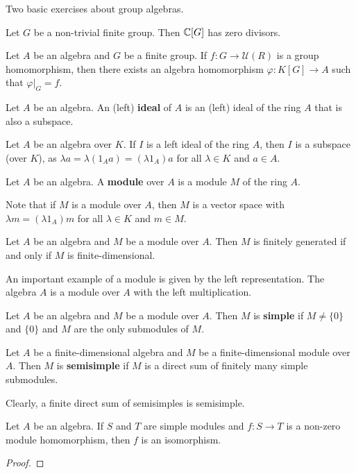 Two basic exercises about group algebras.
 
\begin{exercise}
	Let $G$ be a non-trivial finite group. 
	Then $\mathbb{C}[G]$ has zero divisors. 
\end{exercise}

\begin{exercise}
	Let $A$ be an algebra and $G$ be a finite group. 
	If $f\colon G\to\mathcal{U}(R)$ is a group homomorphism, 
	then there exists an algebra homomorphism 
	$\varphi\colon K[G]\to A$ such that $\varphi|_G=f$.   	
\end{exercise}


\begin{definition}
	Let $A$ be an algebra. An (left) \textbf{ideal} of $A$ is an 
	(left) ideal of the ring $A$ that is also a subspace. 
\end{definition}

Let $A$ be an algebra over $K$. If $I$ is a left ideal of the ring $A$, then 
$I$ is a subspace (over $K$), as $\lambda a=\lambda(1_Aa)=(\lambda 1_A)a$ 
for all $\lambda\in K$ and $a\in A$.  
%

\begin{definition}
	Let $A$ be an algebra. A \textbf{module} over $A$ is a module $M$ of the ring $A$. 
\end{definition}

Note that if $M$ is a module over $A$, 
then $M$ is a vector space 
with $\lambda m=(\lambda 1_A)m$ for all $\lambda\in K$ and $m\in M$. 
 	
\begin{exercise}
	Let $A$ be an algebra and $M$ be a module over $A$. 
	Then $M$ is finitely generated if and only if $M$ is finite-dimensional.
\end{exercise}

An important example of a module is given by the left representation. The 
algebra $A$ is a module over $A$ with the left multiplication. 

\begin{definition}
	Let $A$ be an algebra and $M$ be a module over $A$. Then 
	$M$ is \textbf{simple} if $M\ne\{0\}$ and $\{0\}$ and $M$ 
	are the only submodules of $M$.	
\end{definition}

\begin{definition}
	Let $A$ be a finite-dimensional 
	algebra and $M$ be a finite-dimensional module over $A$. Then 
	$M$ is \textbf{semisimple} if $M$ is a direct sum of 
	finitely many simple submodules.  
\end{definition}

Clearly, a finite direct sum of semisimples is semisimple. 

\begin{lemma}[Schur]
	Let $A$ be an algebra. If $S$ and $T$ are
	simple modules and $f\colon S\to T$ is a non-zero module homomorphism, 
	then $f$ is an isomorphism. 
\end{lemma}

\begin{proof}
	
\end{proof}



 
